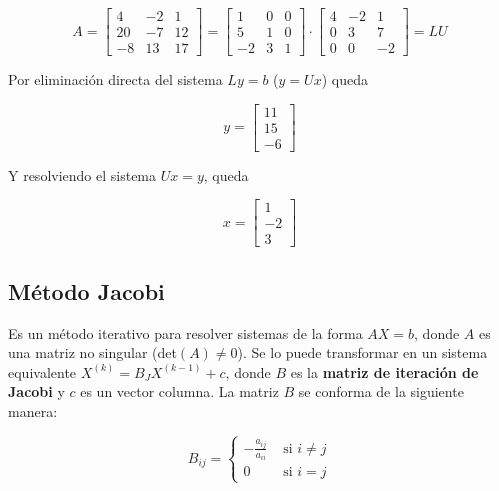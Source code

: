 \documentclass{article}
\begin{document}
\begin{equation*}
    A = \begin{bmatrix}
         4 & -2 &  1 \\
        20 & -7 & 12 \\
        -8 & 13 & 17
    \end{bmatrix} = 
    \begin{bmatrix}
         1 & 0 & 0 \\
         5 & 1 & 0 \\
        -2 & 3 & 1 
    \end{bmatrix} \cdot
    \begin{bmatrix}
        4 & -2 &  1 \\
        0 &  3 &  7 \\
        0 &  0 & -2
    \end{bmatrix} = LU
\end{equation*}

Por eliminación directa del sistema $Ly=b$ ($y=Ux$) queda

\begin{equation*}
    y = \begin{bmatrix}
        11 \\
        15 \\
        -6
    \end{bmatrix}
\end{equation*}

Y resolviendo el sistema $Ux=y$, queda 

\begin{equation*}
    x = \begin{bmatrix}
         1 \\
        -2 \\
         3 
    \end{bmatrix}
\end{equation*}


\subsection{Método Jacobi}

Es un método iterativo para resolver sistemas de la forma $AX=b$, donde $A$ es 
una matriz no singular (det$(A)\neq0$). Se lo puede transformar en un sistema 
equivalente $X^{(k)}=B_JX^{(k-1)}+c$, donde $B$ es la 
\textbf{matriz de iteración de Jacobi} y $c$ es un vector columna. La matriz 
$B$ se conforma de la siguiente manera:

\begin{equation} \label{eq:jacobi}
    B_{ij} = 
    \begin{cases}
        -\frac{a_{ij}}{a_{ii}} &\text{ si } i\neq j \\
        0 &\text{ si } i=j
    \end{cases}
\end{equation}
\end{document}
